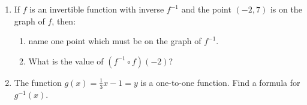 \documentclass[10pt,fleqn]{article}
\begin{document}
\begin{enumerate}
\begin{minipage}[t]{0.5\textwidth}
\begin{enumerate}
  \end{enumerate}
\end{minipage}
\hfill
\begin{minipage}[t]{0.4\textwidth}
  \vspace{-2ex}
\end{minipage}
\item If $f$ is an invertible function with inverse $f^{-1}$ and the point $(-2,7)$
  is on the graph of $f$, then:
  \begin{enumerate}
    \item name one point which must be on the graph of $f^{-1}$.
    \item What is the value of $(f^{-1} \circ f)(-2)$?
  \end{enumerate}
\item The function $g(x) = \frac{1}{3} x - 1 = y$ is a one-to-one function. Find a formula
  for $g^{-1}(x)$.
\end{enumerate}
\end{document}
